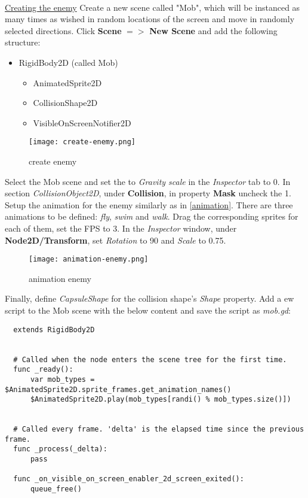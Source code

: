   \paragraph{}
  \href{https://docs.godotengine.org/en/stable/getting_started/first_2d_game/04.creating_the_enemy.html}{\color{blue}Creating the enemy}
  Create a new scene called "Mob", which will be instanced as many times as wished in random locations of the screen and 
  move in randomly selected directions. Click \textbf{Scene} {$=>$} \textbf{New Scene} and add the following structure:
  \begin{itemize}
    \item RigidBody2D (called Mob)
      \begin{itemize}
        \item AnimatedSprite2D
        \item CollisionShape2D
        \item VisibleOnScreenNotifier2D
      \end{itemize}
  \end{itemize}
  \begin{figure}[H]
    \centering
    \texttt{[image: create-enemy.png]}
    \caption{create enemy}
    \label{fig:create-enemy}
  \end{figure}
Select the Mob scene and set the to \textit{Gravity scale} in the \textit{Inspector} tab to 0. 
In section \textit{CollisionObject2D}, under \textbf{Collision}, in property \textbf{Mask} uncheck the 1.
Setup the animation for the enemy similarly as in \ref{animation}. There are three animations to be defined:
\textit{fly}, \textit{swim} and \textit{walk}. Drag the corresponding sprites for each of them, set the FPS to 3.
In the \textit{Inspector} window, under \textbf{Node2D/Transform}, set \textit{Rotation} to 90 and \textit{Scale}
to 0.75.
\begin{figure}[H]
  \centering
  \texttt{[image: animation-enemy.png]}
  \caption{animation enemy}
  \label{fig:animation-enemy}
\end{figure}
Finally, define \textit{CapsuleShape} for the collision shape's \textit{Shape} property. Add a ew script to the Mob scene
with the below content and save the script as \textit{mob.gd}:
\begin{verbatim}
  extends RigidBody2D


  # Called when the node enters the scene tree for the first time.
  func _ready():
	  var mob_types = $AnimatedSprite2D.sprite_frames.get_animation_names()
	  $AnimatedSprite2D.play(mob_types[randi() % mob_types.size()])


  # Called every frame. 'delta' is the elapsed time since the previous frame.
  func _process(_delta):
	  pass

  func _on_visible_on_screen_enabler_2d_screen_exited():
	  queue_free()
\end{verbatim}
